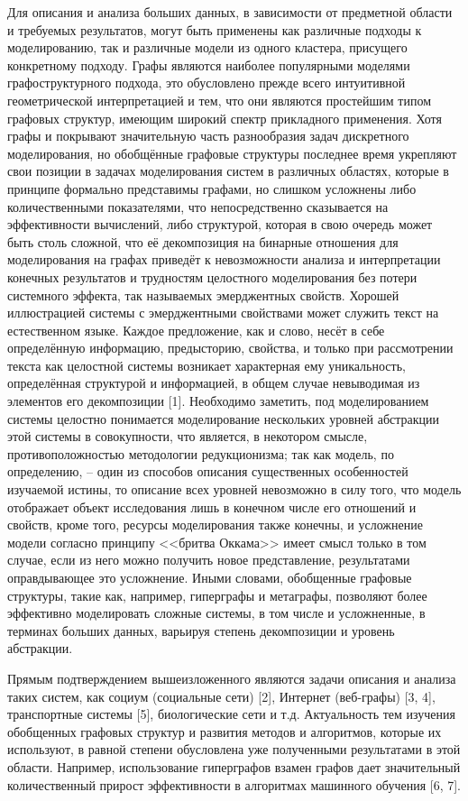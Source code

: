 Для описания и анализа больших данных, в зависимости от предметной области и требуемых результатов, могут быть применены как различные подходы к моделированию, так и различные модели из одного кластера, присущего конкретному подходу. Графы являются наиболее популярными моделями графоструктурного подхода, это обусловлено прежде всего интуитивной геометрической интерпретацией и тем, что они являются простейшим типом графовых структур, имеющим широкий спектр прикладного применения. Хотя графы и покрывают значительную часть разнообразия задач дискретного моделирования, но обобщённые графовые структуры последнее время укрепляют свои позиции в задачах моделирования систем в различных областях, которые в принципе формально представимы графами, но слишком усложнены либо количественными показателями, что непосредственно сказывается на эффективности вычислений, либо структурой, которая в свою очередь может быть столь сложной, что её декомпозиция на бинарные отношения для моделирования на графах приведёт к невозможности анализа и интерпретации конечных результатов и трудностям целостного моделирования без потери системного эффекта, так называемых эмерджентных свойств. Хорошей иллюстрацией системы с эмерджентными свойствами может служить текст на естественном языке. Каждое предложение, как и слово, несёт в себе определённую информацию, предысторию, свойства, и только при рассмотрении текста как целостной системы возникает характерная ему уникальность, определённая структурой и информацией, в общем случае невыводимая из элементов его декомпозиции [1]. Необходимо заметить, под моделированием системы целостно понимается моделирование нескольких уровней абстракции этой системы в совокупности, что является, в некотором смысле, противоположностью методологии редукционизма; так как модель, по определению, -- один из способов описания существенных особенностей изучаемой истины, то описание всех уровней невозможно в силу того, что модель отображает объект исследования лишь в конечном числе его отношений и свойств, кроме того, ресурсы моделирования также конечны, и усложнение модели согласно принципу <<бритва Оккама>> имеет смысл только в том случае, если из него можно получить новое представление, результатами оправдывающее это усложнение. Иными словами, обобщенные графовые структуры, такие как, например, гиперграфы и метаграфы, позволяют более эффективно моделировать сложные системы, в том числе и усложненные, в терминах больших данных, варьируя степень декомпозиции и уровень абстракции.

Прямым подтверждением вышеизложенного являются задачи описания и анализа таких систем, как социум (социальные сети) [2], Интернет (веб-графы) [3, 4], транспортные системы [5], биологические сети и т.д. Актуальность тем изучения обобщенных графовых структур и развития методов и алгоритмов, которые их используют, в равной степени обусловлена уже полученными результатами в этой области. Например, использование гиперграфов взамен графов дает значительный количественный прирост эффективности в алгоритмах машинного обучения [6, 7].

